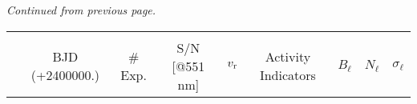 \documentclass[a4paper,fleqn,usenatbib]{mnras}
\begin{document}
\begin{table*}
\begin{threeparttable}
{\hfill \textit{Continued from previous page.}}
\smallskip
\smallskip
{\scriptsize       
\begin{tabular}{c c c c c c c c r r c}    
\hline\hline
& & & & & & & & &\\[-4pt]

& BJD (+2400000.) & \# Exp. & \multicolumn{2}{c}{S/N [@551 nm]} & $v_{\rm r}$ & \multicolumn{2}{c}{Activity Indicators} & \multicolumn{1}{c}{$B_{\ell}$} & \multicolumn{1}{c}{$N_{\ell}$} & $\sigma_{\ell}$ \\[3pt]


\end{tabular}}
\end{threeparttable}
\end{table*}
\end{document}
